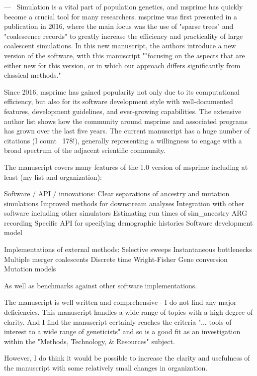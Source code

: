 \documentclass[11pt]{article}
\newcounter{reviewer}
\newcounter{point}[reviewer]
\renewcommand{\thepoint}{\thereviewer.\arabic{point}}
\newenvironment{point}
   {\refstepcounter{point} \bigskip \noindent {\textbf{Reviewer~Point~\thepoint} } ---\ }
   {\par }
\begin{document}
\begin{point}
Simulation is a vital part of population genetics, and msprime has quickly
become a crucial tool for many researchers. msprime was first presented in a
publication in 2016, where the main focus was the use of "sparse trees" and
"coalescence records" to greatly increase the efficiency and practicality of
large coalescent simulations. In this new manuscript, the authors introduce a
new version of the software, with this manuscript ""focusing on the aspects
that are either new for this version, or in which our approach differs
significantly from classical methods."

Since 2016, msprime has gained popularity not only due to its computational
efficiency, but also for its software development style with well-documented
features, development guidelines, and ever-growing capabilities. The extensive
author list shows how the community around msprime and associated programs has
grown over the last five years. The current manuscript has a huge number of
citations (I count ~178!), generally representing a willingness to engage with
a broad spectrum of the adjacent scientific community.

The manuscript covers many features of the 1.0 version of msprime including at
least (my list and organization):

Software / API / innovations:
Clear separations of ancestry and mutation simulations
Improved methods for downstream analyses
Integration with other software including other simulators
Estimating run times of sim\_ancestry
ARG recording
Specific API for specifying demographic histories
Software development model

Implementations of external methods:
Selective sweeps
Instantaneous bottlenecks
Multiple merger coalescents
Discrete time Wright-Fisher
Gene conversion
Mutation models

As well as benchmarks against other software implementations.

The manuscript is well written and comprehensive - I do not find any major
deficiencies. This manuscript handles a wide range of topics with a high degree
of clarity. And I find the manuscript certainly reaches the criteria "... tools
of interest to a wide range of geneticists" and so is a good fit as an
investigation within the "Methods, Technology, \& Resources" subject.

However, I do think it would be possible to increase the clarity and usefulness
of the manuscript with some relatively small changes in organization.
\end{point}
\end{document}
